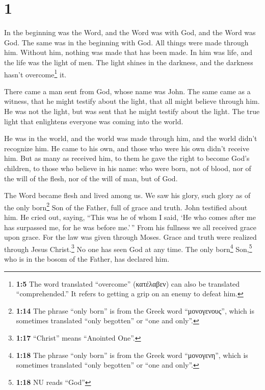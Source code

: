 \hypertarget{section}{%
\section{1}\label{section}}

 In the beginning was the Word, and the Word was with God,
and the Word was God.  The same was in the beginning with
God.  All things were made through him. Without him,
nothing was made that has been made.  In him was life, and
the life was the light of men.  The light shines in the
darkness, and the darkness hasn't overcome\footnote{\textbf{1:5} The
  word translated ``overcome'' (κατέλαβεν) can also be translated
  ``comprehended.'' It refers to getting a grip on an enemy to defeat
  him.} it.

 There came a man sent from God, whose name was John.
 The same came as a witness, that he might testify about
the light, that all might believe through him.  He was not
the light, but was sent that he might testify about the light.
 The true light that enlightens everyone was coming into
the world.

 He was in the world, and the world was made through him,
and the world didn't recognize him.  He came to his own,
and those who were his own didn't receive him.  But as
many as received him, to them he gave the right to become God's
children, to those who believe in his name:  who were
born, not of blood, nor of the will of the flesh, nor of the will of
man, but of God.

 The Word became flesh and lived among us. We saw his
glory, such glory as of the only born\footnote{\textbf{1:14} The phrase
  ``only born'' is from the Greek word ``μονογενους'', which is
  sometimes translated ``only begotten'' or ``one and only''.} Son of
the Father, full of grace and truth.  John testified
about him. He cried out, saying, ``This was he of whom I said, `He who
comes after me has surpassed me, for he was before me.'\,''
 From his fullness we all received grace upon grace.
 For the law was given through Moses. Grace and truth
were realized through Jesus Christ.\footnote{\textbf{1:17} ``Christ''
  means ``Anointed One''.}  No one has seen God at any
time. The only born\footnote{\textbf{1:18} The phrase ``only born'' is
  from the Greek word ``μονογενη'', which is sometimes translated ``only
  begotten'' or ``one and only''.} Son,\footnote{\textbf{1:18} NU reads
  ``God''} who is in the bosom of the Father, has declared him.

